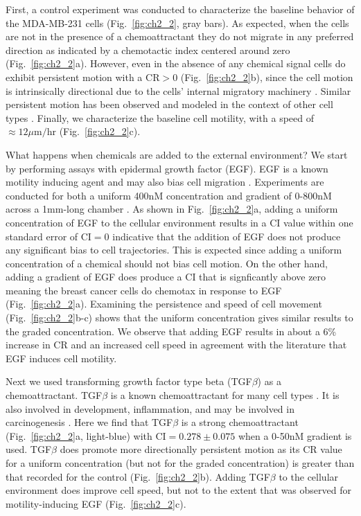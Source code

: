 
First, a control experiment was conducted to characterize the baseline behavior of the MDA-MB-231 cells (Fig.\ \ref{fig:ch2_2}, gray bars). As expected, when the cells are not in the presence of a chemoattractant they do not migrate in any preferred direction as indicated by a chemotactic index centered around zero (Fig.\ \ref{fig:ch2_2}a). However, even in the absence of any chemical signal cells do exhibit persistent motion with a $\text{CR} > 0$ (Fig.\ \ref{fig:ch2_2}b), since the cell motion is intrinsically directional due to the cells' internal migratory machinery \cite{petrie2009random}.
Similar persistent motion has been observed and modeled in the context of other cell types \cite{kim2013cooperative,codling2008random,othmer1988models}. Finally, we characterize the baseline cell motility, with a speed of $\approx 12 \mu\text{m/hr}$ (Fig.\ \ref{fig:ch2_2}c).

What happens when chemicals are added to the external environment? We start by performing assays with epidermal growth factor (EGF). EGF is a known motility inducing agent \cite{kim2013cooperative,mosadegh2008epidermal} and may also bias cell migration \cite{wang2004differential}. Experiments are conducted for both a uniform 400nM concentration and gradient of 0-800nM across a 1mm-long chamber .
As shown in Fig.\ \ref{fig:ch2_2}a, adding a uniform concentration of EGF to the cellular environment results in a CI value within one standard error of $\text{CI} = 0$ indicative that the addition of EGF does not produce any significant bias to cell trajectories. This is expected since adding a uniform concentration of a chemical should not bias cell motion.
On the other hand, adding a gradient of EGF does produce a CI that is signficantly above zero meaning the breast cancer cells do chemotax in response to EGF (Fig.\ \ref{fig:ch2_2}a).
Examining the persistence and speed of cell movement (Fig.\ \ref{fig:ch2_2}b-c) shows that the uniform concentration gives similar results to the graded concentration. We observe that adding EGF results in about a 6\% increase in CR and an increased cell speed in agreement with the literature that EGF induces cell motility.

Next we used transforming growth factor type beta (TGF$\beta$) as a chemoattractant. TGF$\beta$ is a known chemoattractant for many cell types \cite{wahl1987transforming,bischoff1997chemotaxis}.
It is also involved in development, inflammation, and may be involved in carcinogenesis \cite{clark1998molecules,javelaud2004mammalian,pang2016tgf}.
Here we find that TGF$\beta$ is a strong chemoattractant (Fig.\ \ref{fig:ch2_2}a, light-blue) with $\text{CI} = 0.278 \pm 0.075$ when a 0-50nM gradient is used. TGF$\beta$ does promote more directionally persistent motion as its CR value for a uniform concentration (but not for the graded concentration) is greater than that recorded for the control (Fig.\ \ref{fig:ch2_2}b). Adding TGF$\beta$ to the cellular environment does improve cell speed, but not to the extent that was observed for motility-inducing EGF (Fig.\ \ref{fig:ch2_2}c).

